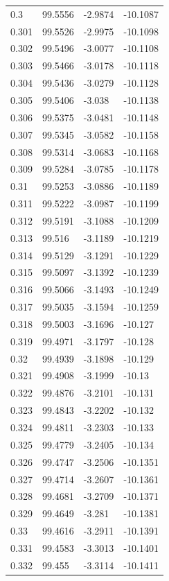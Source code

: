 \begin{tabular}{llll}
0.3 & 99.5556 & -2.9874 & -10.1087 \\
0.301 & 99.5526 & -2.9975 & -10.1098 \\
0.302 & 99.5496 & -3.0077 & -10.1108 \\
0.303 & 99.5466 & -3.0178 & -10.1118 \\
0.304 & 99.5436 & -3.0279 & -10.1128 \\
0.305 & 99.5406 & -3.038 & -10.1138 \\
0.306 & 99.5375 & -3.0481 & -10.1148 \\
0.307 & 99.5345 & -3.0582 & -10.1158 \\
0.308 & 99.5314 & -3.0683 & -10.1168 \\
0.309 & 99.5284 & -3.0785 & -10.1178 \\
0.31 & 99.5253 & -3.0886 & -10.1189 \\
0.311 & 99.5222 & -3.0987 & -10.1199 \\
0.312 & 99.5191 & -3.1088 & -10.1209 \\
0.313 & 99.516 & -3.1189 & -10.1219 \\
0.314 & 99.5129 & -3.1291 & -10.1229 \\
0.315 & 99.5097 & -3.1392 & -10.1239 \\
0.316 & 99.5066 & -3.1493 & -10.1249 \\
0.317 & 99.5035 & -3.1594 & -10.1259 \\
0.318 & 99.5003 & -3.1696 & -10.127 \\
0.319 & 99.4971 & -3.1797 & -10.128 \\
0.32 & 99.4939 & -3.1898 & -10.129 \\
0.321 & 99.4908 & -3.1999 & -10.13 \\
0.322 & 99.4876 & -3.2101 & -10.131 \\
0.323 & 99.4843 & -3.2202 & -10.132 \\
0.324 & 99.4811 & -3.2303 & -10.133 \\
0.325 & 99.4779 & -3.2405 & -10.134 \\
0.326 & 99.4747 & -3.2506 & -10.1351 \\
0.327 & 99.4714 & -3.2607 & -10.1361 \\
0.328 & 99.4681 & -3.2709 & -10.1371 \\
0.329 & 99.4649 & -3.281 & -10.1381 \\
0.33 & 99.4616 & -3.2911 & -10.1391 \\
0.331 & 99.4583 & -3.3013 & -10.1401 \\
0.332 & 99.455 & -3.3114 & -10.1411 \\

\end{tabular}
